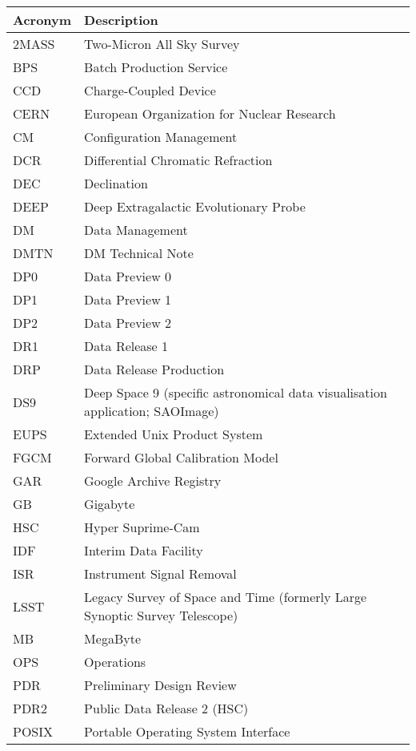 \addtocounter{table}{-1}
\begin{longtable}{p{}p{}}\hline
\textbf{Acronym} & \textbf{Description}  \\\hline

2MASS & Two-Micron All Sky Survey \\\hline
BPS & Batch Production Service \\\hline
CCD & Charge-Coupled Device \\\hline
CERN & European Organization for Nuclear Research \\\hline
CM & Configuration Management \\\hline
DCR & Differential Chromatic Refraction \\\hline
DEC & Declination \\\hline
DEEP & Deep Extragalactic Evolutionary Probe \\\hline
DM & Data Management \\\hline
DMTN & DM Technical Note \\\hline
DP0 & Data Preview 0 \\\hline
DP1 & Data Preview 1 \\\hline
DP2 & Data Preview 2 \\\hline
DR1 & Data Release 1 \\\hline
DRP & Data Release Production \\\hline
DS9 & Deep Space 9 (specific astronomical data visualisation application; SAOImage) \\\hline
EUPS & Extended Unix Product System \\\hline
FGCM & Forward Global Calibration Model \\\hline
GAR & Google Archive Registry \\\hline
GB & Gigabyte \\\hline
HSC & Hyper Suprime-Cam \\\hline
IDF & Interim Data Facility \\\hline
ISR & Instrument Signal Removal \\\hline
LSST & Legacy Survey of Space and Time (formerly Large Synoptic Survey Telescope) \\\hline
MB & MegaByte \\\hline
OPS & Operations \\\hline
PDR & Preliminary Design Review \\\hline
PDR2 & Public Data Release 2 (HSC) \\\hline
POSIX & Portable Operating System Interface \\\hline

\end{longtable}

